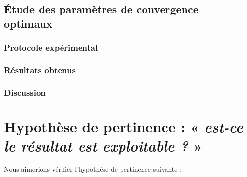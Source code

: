 		\subsection{Étude des paramètres de convergence optimaux}
	
			\subsubsection{Protocole expérimental}

			\subsubsection{Résultats obtenus}

			\subsubsection{Discussion}
	

    \section{Hypothèse de pertinence : « \textit{est-ce le résultat est exploitable ?} »}
	\label{section:4.3-HYPOTHESE-PERTINENCE}
	
		Nous aimerions vérifier l'hypothèse de pertinence suivante :

